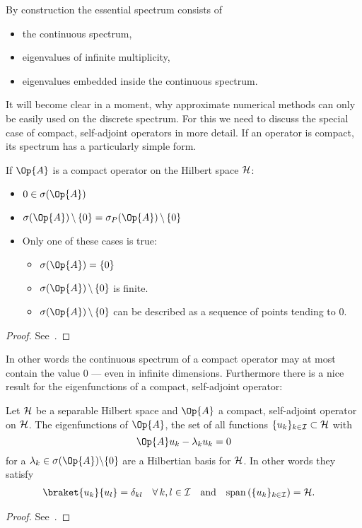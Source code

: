\noindent
By construction the essential spectrum consists of
\begin{itemize}
	\item the continuous spectrum,
	\item eigenvalues of infinite multiplicity,
	\item eigenvalues embedded inside the continuous spectrum.
\end{itemize}
It will become clear in a moment,
why approximate numerical methods can only be easily used
on the discrete spectrum.
For this we need to discuss the special case of
compact, self-adjoint operators in more detail.
If an operator is compact,
its spectrum has a particularly simple form.
\begin{prop}
	\label{prop:CompactSpectrum}
	If $\Op{A}$ is a compact operator on the Hilbert space $\mathcal{H}$:
	\begin{itemize}
		\item $0 \in \sigma(\Op{A})$
		\item $\sigma(\Op{A}) \, \backslash \, \{0\}
			= \sigma_P(\Op{A}) \, \backslash \, \{0\}$
		\item Only one of these cases is true:
			\begin{itemize}
				\item[\textopenbullet] $\sigma(\Op{A}) = \{0\}$
				\item[\textopenbullet] $\sigma(\Op{A}) \, \backslash \, \{0\}$ is finite.
				\item[\textopenbullet]
					$\sigma(\Op{A}) \, \backslash \, \{0\}$ can be described
					as a sequence of points tending to $0$.
			\end{itemize}
	\end{itemize}
	\begin{proof}
		See~\cite[p.~56]{Helffer2013}.
	\end{proof}
\end{prop}
In other words the continuous spectrum of a compact operator
may at most contain the value $0$ --- even in infinite dimensions.
Furthermore there is a nice result for the eigenfunctions of a compact, self-adjoint
operator:
\begin{prop}
	\label{prop:CompactBasis}
	Let $\mathcal{H}$ be a separable Hilbert space and $\Op{A}$ a compact,
	self-adjoint operator on $\mathcal{H}$.
	The eigenfunctions of $\Op{A}$,
	\ie the set of all functions $\{ u_k \}_{k \in \mathcal{I}} \subset \mathcal{H}$
	with
	\[
		\Op{A} u_k - \lambda_k  u_k = 0
	\]
	for a $\lambda_k \in \sigma(\Op{A}) \backslash \{0\}$
	are a Hilbertian basis for $\mathcal{H}$.
	In other words they satisfy
	\begin{align*}
	\braket{u_k}{u_l} &= \delta_{kl} \quad \forall \, k,l \in \mathcal{I}
	&&\text{and}&
	\spacespan \left( \{ u_k \}_{k \in \mathcal{I}} \right) &= \hilbert.
	\end{align*}
	\begin{proof}
		See~\cite[p.~60]{Helffer2013}.
	\end{proof}
\end{prop}

